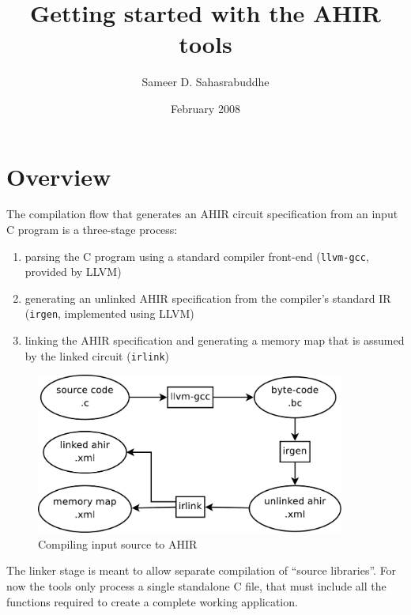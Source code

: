 \documentclass[12pt]{article}
\title{Getting started with the AHIR tools}
\author{Sameer D. Sahasrabuddhe}
\date{February 2008}
\begin{document}
\maketitle

\section{Overview}

The compilation flow that generates an AHIR circuit specification from
an input C program is a three-stage process:
\begin{enumerate}
  \item parsing the C program using a standard compiler front-end
        (\texttt{llvm-gcc}, provided by LLVM)
  \item generating an unlinked AHIR specification from the compiler's
        standard IR (\texttt{irgen}, implemented using LLVM)
  \item linking the AHIR specification and generating a memory map that
        is assumed by the linked circuit (\texttt{irlink})
\end{enumerate}

\begin{figure}[htb]
  \centering
  \includegraphics[keepaspectratio,width=4in]{images/source-to-ahir.pdf}
  \caption{Compiling input source to AHIR}
  \label{figure:source-to-ahir}
\end{figure}

The linker stage is meant to allow separate compilation of ``source
libraries''. For now the tools only process a single standalone C
file, that must include all the functions required to create a complete
working application.

\end{document}
